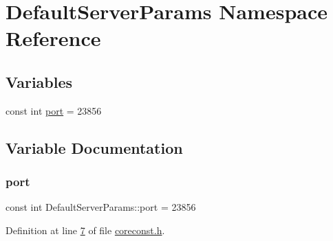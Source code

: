 \hypertarget{a00114}{}\section{Default\+Server\+Params Namespace Reference}
\label{a00114}
\subsection*{Variables}
\begin{DoxyCompactItemize}
\item 
const int \hyperlink{a00114_a7ac0709dc92e311b3524c365a2a05d96}{port} = 23856
\end{DoxyCompactItemize}


\subsection{Variable Documentation}
\mbox{\label{a00114_a7ac0709dc92e311b3524c365a2a05d96}} 
\subsubsection{\texorpdfstring{port}{port}}
{\footnotesize\ttfamily const int Default\+Server\+Params\+::port = 23856}



Definition at line \hyperlink{a00020_source_l00007}{7} of file \hyperlink{a00020_source}{coreconst.\+h}.

